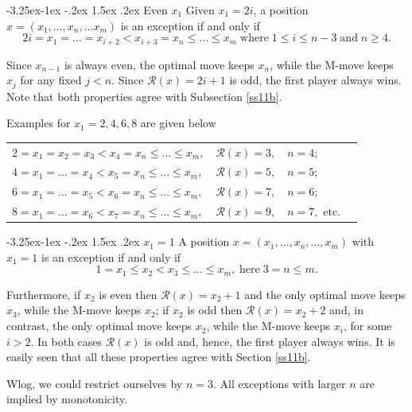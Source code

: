 \documentclass[10pt]{article}
\makeatletter
\renewcommand\subsection{\@startsection{subsection}{2}{\z@}
{-3.25ex\@plus -1ex \@minus -.2ex}
{1.5ex \@plus .2ex}
{\normalfont\normalsize\bfseries\boldmath}}
\theoremstyle{definition}
\def\R{\mathcal{R}}
\makeatother
\begin{document}
\subsection{Even  $x_1$}
\label{ss12}  
Given  $x_1 = 2i$, 
a position $x = (x_1, \ldots, x_n, \ldots x_m)$  
is an exception if and only if 
$$2i = x_1 = \ldots = x_{i+2} < x_{i+3} = x_n \leq \ldots \leq x_m \; 
\text{where} \;  1 \leq i \leq n-3  \; \text{and} \; n \geq 4.$$ 

Since $x_{n-1}$ is always even, 
the optimal move keeps  $x_n$, while 
the M-move keeps  $x_j$ for any fixed $j < n$. 
Since  $\R(x) = 2i+1$  is odd, the first player always wins. 
Note that both properties agree with Subsection \ref{ss11b}. 

Examples for $x_1 = 2, 4, 6, 8$  are given below 

\begin{tabu} to \textwidth{X[4.4] X X[1.1] X[0.5]}
$2 = x_1 = x_2 = x_3 < x_4 = x_n \leq \dots \leq x_m,$ & $\R(x) = 3,$ & $n=4$;&\\
$4 = x_1 = \ldots = x_4 < x_5 = x_n \leq \dots \leq x_m,$ & $\R(x) = 5,$ & $n=5$;&\\
$6 = x_1 = \ldots = x_5 < x_6 = x_n \leq \dots \leq x_m,$ &  $\R(x) = 7,$ & $n=6$;&\\
$8 = x_1 = \ldots = x_6 < x_7 = x_n \leq \dots \leq x_m,$ &  $\R(x) = 9,$ & $n=7, \text{ etc.}$&\\
\end{tabu}

\vspace{5mm}

\subsection{$x_1 = 1$}
\label{ss13}  
A position $x = (x_1, \ldots, x_n, \ldots, x_m)$  with  
$x_1 = 1$ 
is an exception if and only if 
$$1 = x_1 \leq x_2 < x_3 \leq \ldots \leq x_m,  \; 
\text{here} \; 3 = n \leq m.$$ 

Furthermore, if  $x_2$  is even then 
$\R(x) = x_2 + 1$  and the only 
optimal move keeps  $x_3$, 
while the M-move keeps  $x_2$; 
if  $x_2$  is odd then 
$\R(x) = x_2 + 2$  and, in contrast,  
the only optimal move keeps  $x_2$, 
while the M-move keeps  $x_i$,  
for some $i > 2$.
In both cases  $\R(x)$  is odd and,  
hence, the first player always wins.  
It is easily seen that all these properties 
agree with Section \ref{ss11b}. 

Wlog, we could restrict ourselves by  $n=3$. 
All exceptions with larger  $n$  are implied  by monotonicity. 
\end{document}
